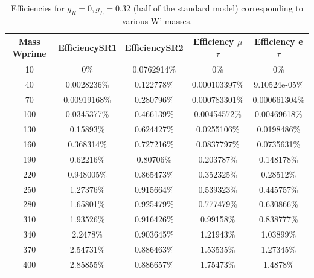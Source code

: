 \begin{table}[htb]
  \centering
  \begin{tabular}{|ccccc|}
    \hline 
    Mass Wprime  & EfficiencySR1  & EfficiencySR2 & Efficiency $\mu$$\tau$ & Efficiency e $\tau$ \\
    \hline 
    10& 0\%        & 0.0762914\%& 0\%         & 0\%\\
    40& 0.0028236\%& 0.122778\%& 0.000103397\%& 9.10524e-05\%\\
    70& 0.00919168\%& 0.280796\%& 0.000783301\%& 0.000661304\%\\
    100& 0.0345377\%& 0.466139\%& 0.00454572\%& 0.00469618\%\\
    130& 0.15893\%& 0.624427\%& 0.0255106\%& 0.0198486\%\\
    160& 0.368314\%& 0.727216\%& 0.0837797\%& 0.0735631\%\\ 
    190& 0.62216\%& 0.80706\%& 0.203787\%& 0.148178\%\\
    220& 0.948005\%& 0.865473\%& 0.352325\%& 0.28512\%\\
    250& 1.27376\%& 0.915664\%& 0.539323\%& 0.445757\%\\ 
    280& 1.65801\%& 0.925479\%& 0.777479\%& 0.630866\%\\ 
    310& 1.93526\%& 0.916426\%& 0.99158\%& 0.838777\%\\ 
    340& 2.2478\%& 0.903645\%& 1.21943\%& 1.03899\%\\ 
    370& 2.54731\%& 0.886463\%& 1.53535\%& 1.27345\%\\ 
    400& 2.85855\%& 0.886657\%& 1.75473\%& 1.4878\%\\
    \hline
  \end{tabular}
  \caption{Efficiencies for $ g_R=0 , g_L=0.32 $ (half of the standard model) corresponding to various W' masses. \label{eff-half} }
\end{table}


